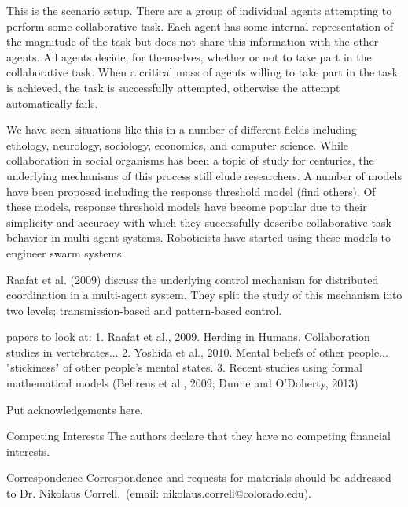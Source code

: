 \documentclass{nature}
\begin{document}
This is the scenario setup. There are a group of individual agents attempting to perform some collaborative task. Each agent has some internal representation of the magnitude of the task but does not share this information with the other agents. All agents decide, for themselves, whether or not to take part in the collaborative task. When a critical mass of agents willing to take part in the task is achieved, the task is successfully attempted, otherwise the attempt automatically fails.

We have seen situations like this in a number of different fields including ethology, neurology, sociology, economics, and computer science. While collaboration in social organisms has been a topic of study for centuries, the underlying mechanisms of this process still elude researchers. A number of models have been proposed including the response threshold model (find others). Of these models, response threshold models have become popular due to their simplicity and accuracy with which they successfully describe collaborative task behavior in multi-agent systems. Roboticists have started using these models to engineer swarm systems.

Raafat et al. (2009) discuss the underlying control mechanism for distributed coordination in a multi-agent system. They split the study of this mechanism into two levels; transmission-based and pattern-based control. 


papers to look at:
1. Raafat et al., 2009. Herding in Humans. Collaboration studies in vertebrates...
2. Yoshida et al., 2010. Mental beliefs of other people...  "stickiness" of other people's mental states.
3. Recent studies using formal mathematical models (Behrens et al., 2009; Dunne and O’Doherty, 2013)



\begin{addendum}
 \item Put acknowledgements here.
 \item[Competing Interests] The authors declare that they have no
competing financial interests.
 \item[Correspondence] Correspondence and requests for materials
should be addressed to Dr. Nikolaus Correll.~(email: nikolaus.correll@colorado.edu).
\end{addendum}

\end{document}
